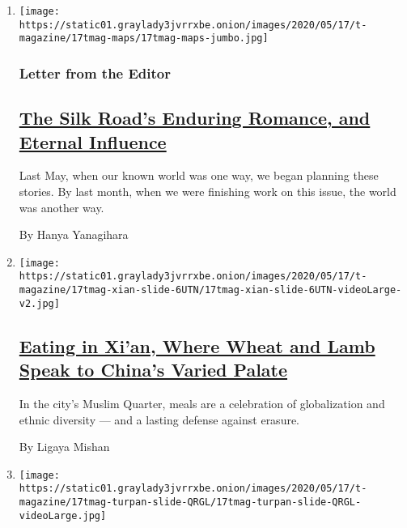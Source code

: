 \begin{enumerate}
\def\labelenumi{\arabic{enumi}.}
\item
  \texttt{[image: https://static01.graylady3jvrrxbe.onion/images/2020/05/17/t-magazine/17tmag-maps/17tmag-maps-jumbo.jpg]}

  \hypertarget{letter-from-the-editor}{%
  \subsubsection{Letter from the Editor}\label{letter-from-the-editor}}

  \hypertarget{the-silk-roads-enduring-romance-and-eternal-influence}{%
  \subsection{\texorpdfstring{\href{/2020/05/11/t-magazine/silk-road-travel-issue.html}{The
  Silk Road's Enduring Romance, and Eternal
  Influence}}{The Silk Road's Enduring Romance, and Eternal Influence}}\label{the-silk-roads-enduring-romance-and-eternal-influence}}

  Last May, when our known world was one way, we began planning these
  stories. By last month, when we were finishing work on this issue, the
  world was another way.

  By Hanya Yanagihara
\item
  \texttt{[image: https://static01.graylady3jvrrxbe.onion/images/2020/05/17/t-magazine/17tmag-xian-slide-6UTN/17tmag-xian-slide-6UTN-videoLarge-v2.jpg]}

  \hypertarget{eating-in-xian-where-wheat-and-lamb-speak-to-chinas-varied-palate}{%
  \subsection{\texorpdfstring{\href{/2020/05/11/t-magazine/xian-china-food.html}{Eating
  in Xi'an, Where Wheat and Lamb Speak to China's Varied
  Palate}}{Eating in Xi'an, Where Wheat and Lamb Speak to China's Varied Palate}}\label{eating-in-xian-where-wheat-and-lamb-speak-to-chinas-varied-palate}}

  In the city's Muslim Quarter, meals are a celebration of globalization
  and ethnic diversity --- and a lasting defense against erasure.

  By Ligaya Mishan
\item
  \texttt{[image: https://static01.graylady3jvrrxbe.onion/images/2020/05/17/t-magazine/17tmag-turpan-slide-QRGL/17tmag-turpan-slide-QRGL-videoLarge.jpg]}


\end{enumerate}
